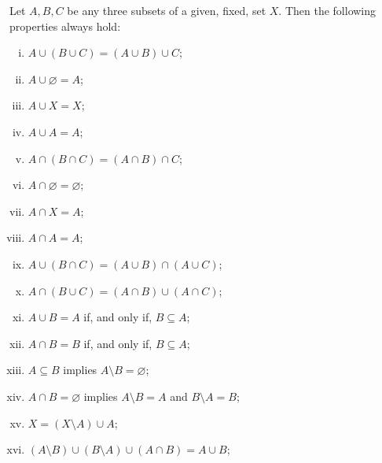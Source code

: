 \begin{pp}
	Let $A,B,C$ be any three subsets of a given, fixed, set $X$. Then the following properties always hold:
	\begin{enumerate}[i.)]
		\item $A\cup(B\cup C)=(A\cup B)\cup C$;
		\item $A\cup\varnothing = A$;
		\item $A\cup X=X$;
		\item $A\cup A=A$;
		\item $A\cap(B\cap C)=(A\cap B)\cap C$;
		\item $A\cap\varnothing=\varnothing$;
		\item $A\cap X=A$;
		\item $A\cap A=A$;
		\item $A\cup(B\cap C)=(A\cup B)\cap(A\cup C)$;
		\item $A\cap(B\cup C)=(A\cap B)\cup(A\cap C)$;
		\item $A\cup B=A$ if, and only if, $B\subseteq A$;
		\item $A\cap B=B$ if, and only if, $B\subseteq A$;
		\item $A\subseteq B$ implies $A\setminus B=\varnothing$;
		\item $A\cap B=\varnothing$ implies $A\setminus B=A$ and $B\setminus A=B$;
		\item $X=(X\setminus A)\cup A$;
		\item $(A\setminus B)\cup(B\setminus A)\cup(A\cap B)=A\cup B$;
	\end{enumerate}
\end{pp}